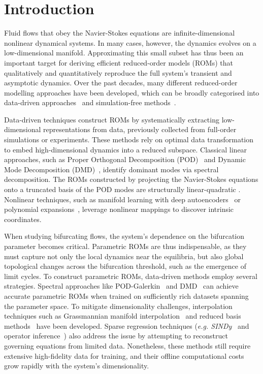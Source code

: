 \documentclass[%
reprint,
superscriptaddress,
 amsmath,amssymb,
 aps,
 pre
]{revtex4-2}
\begin{document}

\section{Introduction}

Fluid flows that obey the Navier-Stokes equations are infinite-dimensional nonlinear dynamical systems. In many cases, however, the dynamics evolves on a low-dimensional manifold. Approximating this small subset has thus been an important target for deriving efficient reduced-order models (ROMs) that qualitatively and quantitatively reproduce the full system's transient and asymptotic dynamics. Over the past decades, many different reduced-order modelling approaches have been developed, which can be broadly categorised into data-driven approaches~\cite{PODturbflows,noack2003jfm,DMD2014,kutz2016book,rowley2017arfm,loiseau2018jfm,brunton2020arfm,kaszas2022prf,bruntonSINDy,sipp2016amr,deng2020jfm,schmid2022annurev} and simulation-free methods~\cite{HaragusIooss,TITI1990,Carini2015,GallairePush,Buza:NS}.

Data-driven techniques construct ROMs by systematically extracting low-dimensional representations from data, previously collected from full-order simulations or experiments. These methods rely on optimal data transformation to embed high-dimensional dynamics into a reduced subspace. Classical linear approaches, such as Proper Orthogonal Decomposition (POD)~\cite{PODturbflows} and Dynamic Mode Decomposition (DMD)~\cite{DMD2014}, identify dominant modes via spectral decomposition. The ROMs constructed by projecting the Navier-Stokes equations onto a truncated basis of the POD modes are structurally linear-quadratic \cite{stuart1958,noack2003jfm,deng2020jfm}. 
Nonlinear techniques, such as manifold learning with deep autoencoders~\cite{lusch2018nature,chen2018neuralODE} or polynomial expansions~\cite{ssmlearn}, leverage nonlinear mappings to discover intrinsic coordinates.

When studying bifurcating flows, the system's dependence on the bifurcation parameter becomes critical. Parametric ROMs are thus indispensable, as they must capture not only the local dynamics near the equilibria, but also global topological changes across the bifurcation threshold, such as the emergence of limit cycles. To construct parametric ROMs, data-driven methods employ several strategies. Spectral approaches like POD-Galerkin~\cite{sipp2016amr,noack2003jfm} and DMD~\cite{schmid2022annurev}  can achieve accurate parametric ROMs when trained on sufficiently rich datasets spanning the parameter space. To mitigate dimensionality challenges, interpolation techniques such as Grassmannian manifold interpolation~\cite{Amsallem2009} and reduced basis methods~\cite{Rozza2007RB} have been developed. Sparse regression techniques (\textit{e.g. SINDy}~\cite{bruntonSINDy} and operator inference~\cite{Peherstorfer2016}) also address the issue by attempting to reconstruct governing equations from limited data. Nonetheless, these methods still require extensive high-fidelity data for training, and their offline computational costs grow rapidly with the system's dimensionality.
\end{document}
